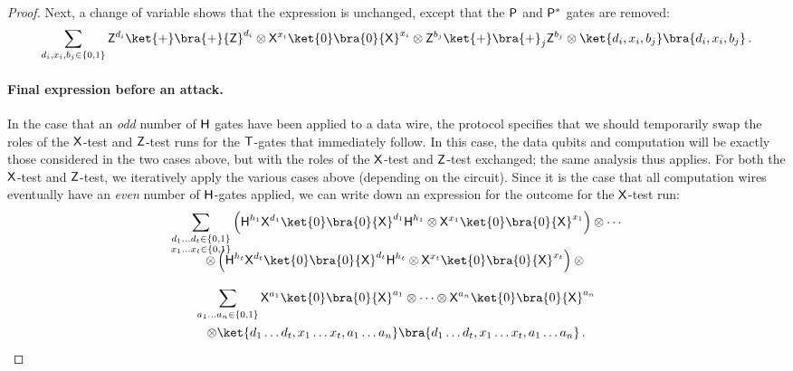 \documentclass{toc}
\newcommand{\hgate}{{\sf H}}
\newcommand{\pgate}{{\sf P}}
\newcommand{\tgate}{{\sf T}}
\newcommand{\xgate}{{\sf X}}
\newcommand{\zgate}{{\sf Z}}
\newcommand{\ketbra}[2]{\ket{#1}\bra{#2}}			%
\newcommand{\egoketbra}[1]{\ketbra{#1}{#1}}			%
\begin{document}
\begin{proof}
Next, a  change of variable shows that the expression is unchanged, except that the $\pgate$ and $\pgate^*$ gates are removed:
 \begin{equation}
\sum_{d_i,x_i,b_j \in \{0,1\}} \zgate^{d_i}\egoketbra{+}\zgate^{d_i} \otimes \xgate^{x_i}\egoketbra{0}\xgate^{x_i} \otimes
\zgate^{b_j}\egoketbra{+}_j\zgate^{b_j}\otimes \egoketbra{d_i, x_i, b_j}\,.
\end{equation}

%

\paragraph{Final expression before an attack.}
In the case that an \emph{odd} number of $\hgate$ gates have been applied to a data wire, the protocol specifies that we should temporarily swap the roles of the $\xgate$-test and $\zgate$-test runs for the $\tgate$-gates that   immediately follow. In this case, the data qubits and computation will be exactly those considered in the two cases above, but with the roles of the $\xgate$-test and $\zgate$-test exchanged; the same analysis thus applies. For both the $\xgate$-test and $\zgate$-test,  we iteratively apply the various cases above (depending on the circuit). Since it is the case that all computation wires eventually have an \emph{even} number of $\hgate$-gates applied, we can write down an expression for the outcome for the  $\xgate$-test run:
\begin{multline}
\label{eqn:x-test-end}
 \sum_{\substack{d_1 \ldots d_t \in \{0,1\} \\ x_1 \ldots x_t \in \{0,1\}}}
 \left(\hgate^{h_1} \xgate^{d_1} \egoketbra{0} \xgate^{d_1} {\hgate}^{h_1} \otimes
  \xgate^{x_1} \egoketbra{0} \xgate^{x_1}\right) \otimes  \cdots  \\[-2ex]
   \otimes  \left( \hgate^{h_t} \xgate^{d_t}  \egoketbra{0} \xgate^{d_t} {\hgate}^{h_t}  \otimes  \xgate^{x_t} \egoketbra{0} \xgate^{x_t}\right)
\otimes  {}\\[2ex]\sum_{a_1 \ldots a_n \in \{0,1\}} \xgate^{a_1} \egoketbra{0} \xgate^{a_1} \otimes \cdots \otimes \xgate^{a_n} \egoketbra{0} \xgate^{a_n}\\
\otimes \egoketbra{d_1 \ldots d_t, x_1 \ldots x_t,a_1 \ldots a_n}\,.
\end{multline}



\end{proof}
\end{document}
